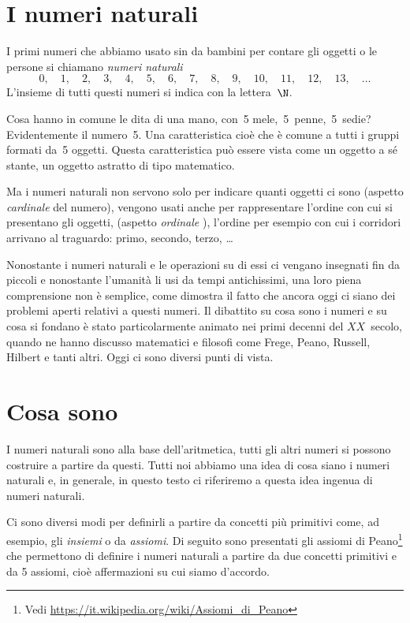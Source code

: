 \section{I numeri naturali}
\label{sec:nat_naturali}

I primi numeri che abbiamo usato sin da bambini per contare gli oggetti o 
le persone si chiamano \emph{numeri naturali}
\[0,\quad 1,\quad 2,\quad 3,\quad 4,\quad 5,\quad 6,\quad 7,\quad 8,\quad 
  9,\quad 10,\quad 11,\quad 12,\quad 13,\quad \dots\]
L'insieme di tutti questi numeri si indica con la lettera~\(\N\).

Cosa hanno in comune le dita di una mano, con~5 mele,~5~penne,~5~sedie? 
Evidentemente il numero~5. Una caratteristica cioè che è comune a tutti i 
gruppi formati da~5 oggetti. 
Questa caratteristica può essere vista come un oggetto a sé stante, 
un oggetto astratto di tipo matematico.

Ma i numeri naturali non servono solo per indicare quanti oggetti ci sono 
(aspetto \emph{cardinale}  del numero), vengono usati 
anche per rappresentare 
l'ordine con cui si presentano gli oggetti, (aspetto \emph{ordinale} 
), 
l'ordine per esempio con cui i corridori arrivano al traguardo: primo, 
secondo, terzo, \ldots

Nonostante i numeri naturali e le operazioni su di essi ci vengano 
insegnati fin da piccoli e nonostante l'umanità li usi da tempi 
antichissimi, una loro piena comprensione non è semplice, come dimostra 
il fatto che ancora oggi ci siano dei problemi aperti relativi a questi 
numeri. 
Il dibattito su cosa sono i numeri e su cosa si fondano è stato 
particolarmente animato nei primi decenni del \(XX\)~secolo, quando ne 
hanno discusso matematici e filosofi come Frege, Peano, Russell, Hilbert e 
tanti altri. 
Oggi ci sono diversi punti di vista.


\section{Cosa sono}
\label{sec:nat_definizione}

I numeri naturali sono alla base dell'aritmetica, 
tutti gli altri numeri si possono costruire a partire da questi. 
Tutti noi abbiamo una idea di cosa siano i numeri naturali e, in generale, 
in questo testo ci riferiremo a questa idea ingenua di numeri naturali.

Ci sono diversi modi per definirli a partire da concetti più primitivi 
come, ad esempio, gli \emph{insiemi} o da \emph{assiomi}.
Di seguito sono presentati gli assiomi di Peano\footnote{
Vedi \url{https://it.wikipedia.org/wiki/Assiomi_di_Peano}}
che permettono di definire i numeri naturali a partire da due concetti 
primitivi e da 5 assiomi, cioè affermazioni su cui 
siamo d'accordo.

